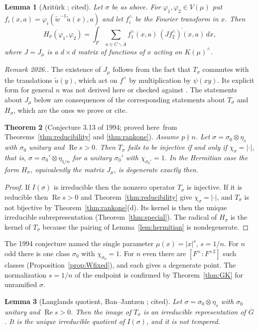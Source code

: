 \documentclass[12pt,letterpaper]{article}
\numberwithin{equation}{section}
\newtheorem{theorem}{Theorem}[section]
\newtheorem{lemma}[theorem]{Lemma}
\theoremstyle{definition}
\newcounter{rmk}
\newcommand{\unverified}[1]{\refstepcounter{rmk}\par\smallskip\noindent\textit{Remark 2026.\arabic{rmk}.} #1\par\smallskip}
\newcommand{\proved}{proved here}
\newcommand{\cited}{cited}
\newcommand{\bG}{\overline{G}}
\newcommand{\bA}{\overline{A}}
\newcommand{\bC}{\overline{C}}
\newcommand{\wt}{\tilde w}
\newcommand{\ul}{\tilde u}
\DeclareMathOperator{\re}{Re}
\begin{document}
\begin{lemma}[Arit\"urk \cite{Ar80}; \cited]\label{lem:J}
Let $\sigma$ be as above.  For $\varphi_1,\varphi_2\in V(\mu)$ put
$f_i(x,a)=\varphi_i(\wt^{-1}\ul(x),a)$ and let $f_i^\wedge$ be the Fourier transform in $x$.
Then
\[
H_\sigma(\varphi_1,\varphi_2)=\int_F\sum_{a\in\bC\backslash\bA}f_1^\wedge(x,a)\,\overline{(Jf_2^\wedge)(x,a)}\,dx,
\]
where $J=J_\mu$ is a $d\times d$ matrix of functions of $x$ acting on $K(\mu)^\wedge$.
\end{lemma}
\unverified{The existence of $J_\mu$ follows from the fact that $T_\sigma$ commutes with
the translations $\ul(y)$, which act on $f^\wedge$ by multiplication by $\psi(xy)$.  Its
explicit form for general $n$ was not derived here or checked against \cite{Ar80}.  The
statements about $J_\mu$ below are consequences of the corresponding statements about
$T_\sigma$ and $H_\sigma$, which are the ones we prove or cite.}

\begin{theorem}[Conjecture 3.13 of 1994; \proved\ from Theorems~\ref{thm:reducibility} and
\ref{thm:rankone}]\label{thm:detJ}
Assume $p\nmid n$.  Let $\sigma=\sigma_0\otimes\eta_s$ with $\sigma_0$ unitary and
$\re s>0$.  Then $T_\sigma$ fails to be injective if and only if $\chi_\sigma=|\cdot|$,
that is, $\sigma=\sigma_0'\otimes\eta_{1/n}$ for a unitary $\sigma_0'$ with
$\chi_{\sigma_0'}=1$.  In the Hermitian
case the form $H_\sigma$, equivalently the matrix $J_\mu$, is degenerate exactly then.
\end{theorem}
\begin{proof}
If $I(\sigma)$ is irreducible then the nonzero operator $T_\sigma$ is injective.  If it is
reducible then $\re s>0$ and Theorem~\ref{thm:reducibility} give $\chi_\sigma=|\cdot|$, and
$T_\sigma$ is not bijective by Theorem~\ref{thm:rankone}(d).  Its kernel is then the unique
irreducible subrepresentation (Theorem~\ref{thm:special}).  The radical of $H_\sigma$ is
the kernel of $T_\sigma$ because the pairing of Lemma~\ref{lem:hermitian} is nondegenerate.
\end{proof}
The 1994 conjecture named the single parameter $\mu(x)=|x|^s$, $s=1/n$.  For $n$ odd there
is one class $\sigma_0$ with $\chi_{\sigma_0}=1$.  For $n$ even there are
$[F^\times:F^{\times2}]$ such classes (Proposition~\ref{prop:Wfixed}), and each gives a
degenerate point.  The normalization $s=1/n$ of the endpoint is confirmed by
Theorem~\ref{thm:GK} for unramified $\sigma$.

\begin{lemma}[Langlands quotient, Ban--Jantzen \cite{BJ13,BJ16}; \cited]\label{lem:langlands}
Let $\sigma=\sigma_0\otimes\eta_s$ with $\sigma_0$ unitary and $\re s>0$.  Then the image of
$T_\sigma$ is an irreducible representation of $\bG$.  It is the unique irreducible
quotient of $I(\sigma)$, and it is not tempered.
\end{lemma}
\end{document}
